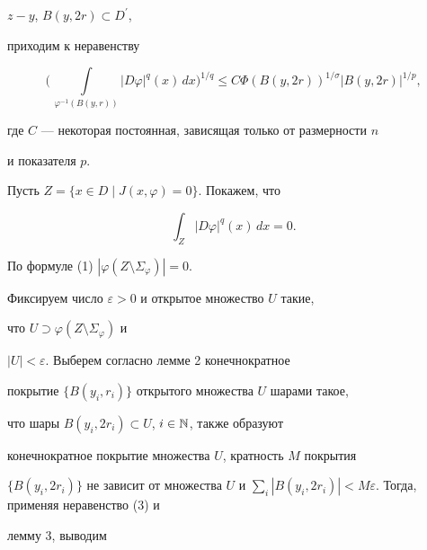 $z-y$, $B(y,2r)\subset D^{\prime}$,


приходим к неравенству


\begin{equation}


\bigg(\,\int\limits_{\varphi^{-1}(B(y,r))}|D\varphi|^q(x)\,dx


\bigg)^{1/q}\leq C\Phi(B(y,2r))^{1/\sigma}|B(y,2r)|^{1/p},


\end{equation}


где $C$ --- некоторая постоянная, зависящая только от размерности $n$


и показателя $p$.





Пусть $Z=\{x\in D\mid J(x,\varphi)=0\}$. Покажем, что


\begin{equation}


\int_{Z}|D\varphi|^q(x)\,dx=0.


\end{equation}


По формуле (1) $|\varphi(Z\setminus \Sigma_{\varphi})|=0$.


Фиксируем число $\varepsilon>0$ и открытое множество $U$ такие,


что $U\supset \varphi(Z\setminus \Sigma_{\varphi})$ и


$|U|<\varepsilon$. Выберем согласно лемме 2 конечнократное


покрытие $\{B(y_i,r_i)\}$ открытого множества $U$ шарами такое,


что шары $B(y_i,2r_i)\subset U$, $i\in{\Bbb N}$, также образуют


конечнократное покрытие множества $U$, кратность $M$ покрытия


$\{B(y_i,2r_i)\}$ не зависит от множества $U$ и $\sum\limits_i


|B(y_i,2r_i)|<M\varepsilon$. Тогда, применяя неравенство (3) и


лемму 3, выводим



